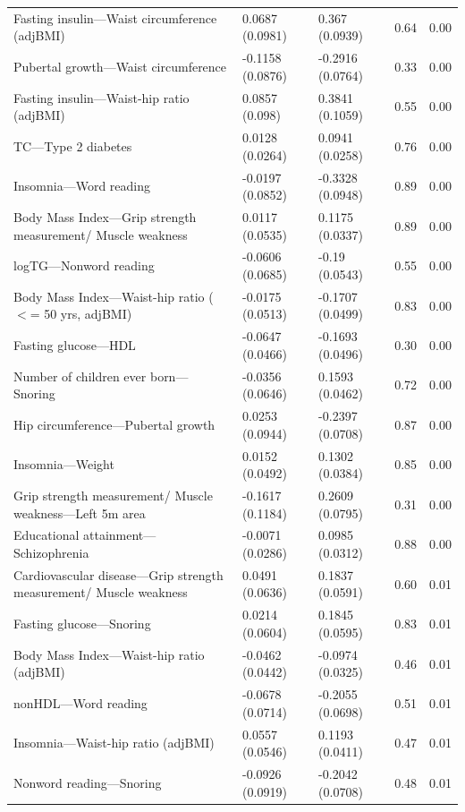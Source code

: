 \begin{table}[ht]
\begin{tabular}{lllrr}
  Fasting insulin---Waist circumference (adjBMI) & 0.0687 (0.0981) & 0.367 (0.0939) & 0.64 & 0.00 \\ 
  Pubertal growth---Waist circumference & -0.1158 (0.0876) & -0.2916 (0.0764) & 0.33 & 0.00 \\ 
  Fasting insulin---Waist-hip ratio (adjBMI) & 0.0857 (0.098) & 0.3841 (0.1059) & 0.55 & 0.00 \\ 
  TC---Type 2 diabetes & 0.0128 (0.0264) & 0.0941 (0.0258) & 0.76 & 0.00 \\ 
  Insomnia---Word reading & -0.0197 (0.0852) & -0.3328 (0.0948) & 0.89 & 0.00 \\ 
  Body Mass Index---Grip strength measurement/ Muscle weakness & 0.0117 (0.0535) & 0.1175 (0.0337) & 0.89 & 0.00 \\ 
  logTG---Nonword reading & -0.0606 (0.0685) & -0.19 (0.0543) & 0.55 & 0.00 \\ 
  Body Mass Index---Waist-hip ratio ($<$= 50 yrs, adjBMI) & -0.0175 (0.0513) & -0.1707 (0.0499) & 0.83 & 0.00 \\ 
  Fasting glucose---HDL & -0.0647 (0.0466) & -0.1693 (0.0496) & 0.30 & 0.00 \\ 
  Number of children ever born---Snoring & -0.0356 (0.0646) & 0.1593 (0.0462) & 0.72 & 0.00 \\ 
  Hip circumference---Pubertal growth & 0.0253 (0.0944) & -0.2397 (0.0708) & 0.87 & 0.00 \\ 
  Insomnia---Weight & 0.0152 (0.0492) & 0.1302 (0.0384) & 0.85 & 0.00 \\ 
  Grip strength measurement/ Muscle weakness---Left 5m area & -0.1617 (0.1184) & 0.2609 (0.0795) & 0.31 & 0.00 \\ 
  Educational attainment---Schizophrenia & -0.0071 (0.0286) & 0.0985 (0.0312) & 0.88 & 0.00 \\ 
  Cardiovascular disease---Grip strength measurement/ Muscle weakness & 0.0491 (0.0636) & 0.1837 (0.0591) & 0.60 & 0.01 \\ 
  Fasting glucose---Snoring & 0.0214 (0.0604) & 0.1845 (0.0595) & 0.83 & 0.01 \\ 
  Body Mass Index---Waist-hip ratio (adjBMI) & -0.0462 (0.0442) & -0.0974 (0.0325) & 0.46 & 0.01 \\ 
  nonHDL---Word reading & -0.0678 (0.0714) & -0.2055 (0.0698) & 0.51 & 0.01 \\ 
  Insomnia---Waist-hip ratio (adjBMI) & 0.0557 (0.0546) & 0.1193 (0.0411) & 0.47 & 0.01 \\ 
  Nonword reading---Snoring & -0.0926 (0.0919) & -0.2042 (0.0708) & 0.48 & 0.01 \\ 

\end{tabular}
\end{table}
